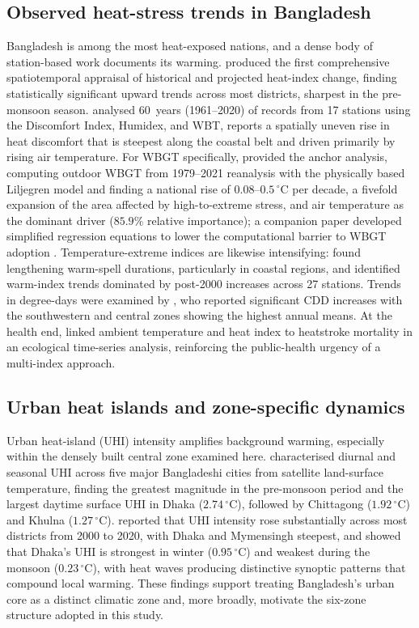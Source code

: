 \documentclass[review,11pt]{elsarticle}
\newcommand{\degC}{\ensuremath{^{\circ}\mathrm{C}}}
\begin{document}
\subsection{Observed heat-stress trends in Bangladesh}
Bangladesh is among the most heat-exposed nations, and a dense body of
station-based work documents its warming. \citet{rahman2021} produced the first
comprehensive spatiotemporal appraisal of historical and projected heat-index
change, finding statistically significant upward trends across most districts,
sharpest in the pre-monsoon season. \citet{tanim2024heat} analysed 60~years
(1961--2020) of records from 17 stations using the Discomfort Index, Humidex, and
WBT, reports a spatially uneven rise in heat discomfort that is steepest along
the coastal belt and driven primarily by rising air temperature. For WBGT
specifically, \citet{kamal2024scientific} provided the anchor analysis, computing
outdoor WBGT from 1979--2021 reanalysis with the physically based Liljegren model
and finding a national rise of $0.08$--$0.5\,\degC$ per decade, a fivefold
expansion of the area affected by high-to-extreme stress, and air temperature as
the dominant driver ($85.9\%$ relative importance); a companion paper developed
simplified regression equations to lower the computational barrier to WBGT
adoption \citep{kamal2024ijc}. Temperature-extreme indices are likewise
intensifying: \citet{ahmed2022} found lengthening warm-spell durations,
particularly in coastal regions, and \citet{islam2021extremes} identified
warm-index trends dominated by post-2000 increases across 27 stations. Trends in
degree-days were examined by \citet{islam2020cdd}, who reported significant CDD
increases with the southwestern and central zones showing the highest annual
means. At the health end, \citet{miah2026} linked ambient temperature and heat
index to heatstroke mortality in an ecological time-series analysis, reinforcing
the public-health urgency of a multi-index approach.

\subsection{Urban heat islands and zone-specific dynamics}
Urban heat-island (UHI) intensity amplifies background warming, especially within
the densely built central zone examined here. \citet{dewan2021} characterised
diurnal and seasonal UHI across five major Bangladeshi cities from satellite
land-surface temperature, finding the greatest magnitude in the pre-monsoon period
and the largest daytime surface UHI in Dhaka ($2.74\,\degC$), followed by
Chittagong ($1.92\,\degC$) and Khulna ($1.27\,\degC$). \citet{faisal2022} reported
that UHI intensity rose substantially across most districts from 2000 to 2020,
with Dhaka and Mymensingh steepest, and \citet{park2024} showed that Dhaka's UHI
is strongest in winter ($0.95\,\degC$) and weakest during the monsoon
($0.23\,\degC$), with heat waves producing distinctive synoptic patterns that
compound local warming. These findings support treating Bangladesh's urban core as
a distinct climatic zone and, more broadly, motivate the six-zone structure adopted
in this study.
\end{document}
